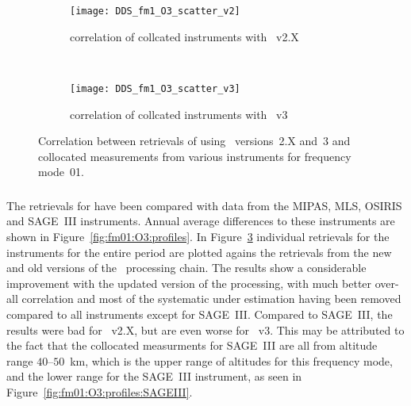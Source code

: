 \begin{figure}[htpb]
    \centering
    \begin{subfigure}[b]{0.49\textwidth}
        \texttt{[image: DDS\_fm1\_O3\_scatter\_v2]}
        \caption{correlation of collcated instruments with \smr~v2.X}
        \label{fig:fm01:O3:scatter:v2}
    \end{subfigure}
    \,
    \begin{subfigure}[b]{0.49\textwidth}
        \texttt{[image: DDS\_fm1\_O3\_scatter\_v3]}
        \caption{correlation of collcated instruments with \smr~v3}
        \label{fig:fm01:O3:scatter:v3}
    \end{subfigure}
    \caption{Correlation between retrievals of  using \smr\
    versions~2.X and~3 and collocated measurements from various instruments
    for frequency mode~01.}
    \label{fig:fm01:O3:scatter}
\end{figure}

\subsubsection{}
\label{sec:fm01:comparison:O3}
The retrievals for \chem{O_3} have been compared with data from the MIPAS, MLS,
OSIRIS and SAGE~III instruments. Annual average differences to these
instruments are shown in Figure~\ref{fig:fm01:O3:profiles}. In
Figure~\ref{fig:fm01:O3:scatter} individual retrievals for the instruments for
the entire period are plotted agains the retrievals from the new and old
versions of the \smr\ processing chain. The results show a considerable
improvement with the updated version of the processing, with much better
over-all correlation and most of the systematic under estimation having been
removed compared to all instruments except for SAGE~III. Compared to SAGE~III,
the results were bad for \smr~v2.X, but are even worse for \smr~v3. This may be
attributed to the fact that the collocated measurments for SAGE~III are all
from altitude range $40$--$50$~km, which is the upper range of altitudes for
this frequency mode, and the lower range for the SAGE~III instrument, as seen
in Figure~\ref{fig:fm01:O3:profiles:SAGEIII}.



